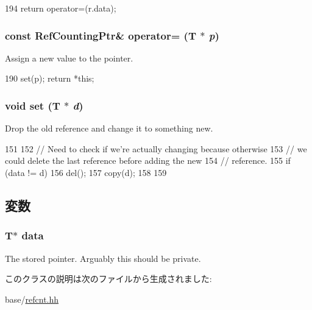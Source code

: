 \begin{DoxyCode}
194     { return operator=(r.data); }
\end{DoxyCode}
\hypertarget{classRefCountingPtr_abe913c8dc8f8a418383762d6688f08e4}{
\subsubsection[{operator=}]{\setlength{\rightskip}{0pt plus 5cm}const {\bf RefCountingPtr}\& operator= (T $\ast$ {\em p})}}
\label{classRefCountingPtr_abe913c8dc8f8a418383762d6688f08e4}


Assign a new value to the pointer. 


\begin{DoxyCode}
190 { set(p); return *this; }
\end{DoxyCode}
\hypertarget{classRefCountingPtr_a4bc01a1a918510bef2013a1f089f19fd}{
\subsubsection[{set}]{\setlength{\rightskip}{0pt plus 5cm}void set (T $\ast$ {\em d})}}
\label{classRefCountingPtr_a4bc01a1a918510bef2013a1f089f19fd}
Drop the old reference and change it to something new. 


\begin{DoxyCode}
151     {
152         // Need to check if we're actually changing because otherwise
153         // we could delete the last reference before adding the new
154         // reference.
155         if (data != d) {
156             del();
157             copy(d);
158         }
159     }
\end{DoxyCode}


\subsection{変数}
\hypertarget{classRefCountingPtr_ac88dceffbecaed1137b0e27783adbcc5}{
\subsubsection[{data}]{\setlength{\rightskip}{0pt plus 5cm}T$\ast$ {\bf data}}}
\label{classRefCountingPtr_ac88dceffbecaed1137b0e27783adbcc5}
The stored pointer. Arguably this should be private. 

このクラスの説明は次のファイルから生成されました:\begin{DoxyCompactItemize}
\item 
base/\hyperlink{refcnt_8hh}{refcnt.hh}\end{DoxyCompactItemize}
